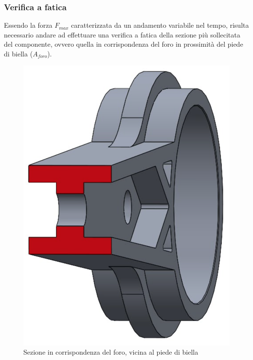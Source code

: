\subsubsection{Verifica a fatica}
Essendo la forza $F_{max}$ caratterizzata da un andamento variabile nel tempo, risulta necessario andare ad effettuare una verifica a fatica della sezione più sollecitata del componente, ovvero quella in corrispondenza del foro in prossimità del piede di biella ($A_{foro}$).
\begin{figure}[h]
    \centering
    \includegraphics[scale=0.3]{Immagini/SezioneForoBiella.png}
    \caption{Sezione in corrispondenza del foro, vicina al piede di biella}
    \label{fig:SezioneForoBiella}
\end{figure}

